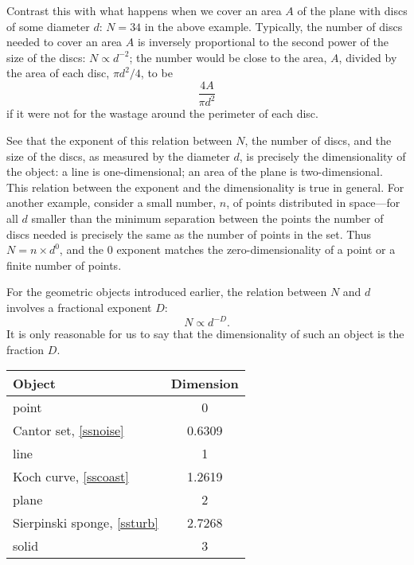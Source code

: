 \documentclass[12pt,a5paper]{article}
\begin{document}
Contrast this with what happens when we cover an area $A$ of the plane 
with discs of some diameter $d$: 
\(
	N=34
\)
 in the above example.  Typically, 
the number of discs needed to cover an area 
\(
	A
\)
is inversely proportional to the second power of the size of the 
discs: $N\propto d^{-2}$; the number would be close to the area, 
$A$, divided by the area of each disc, $\pi d^2/4$, to be  
\[
	\frac{4A}{\pi d^2}
\]
if it were not for the wastage around the perimeter of 
each disc.

See that the exponent of this relation between $N$, the number of 
discs, and the size of the discs, as measured by the diameter $d$, 
is precisely the dimensionality of the object: a line is 
one-dimensional; an area of the plane is two-dimensional.  This 
relation between the exponent and the dimensionality is true in 
general.  For another example, consider a small number, $n$, of 
points distributed in space---for all
\(
	d
\)
smaller than the minimum separation between the points the number of 
discs needed is precisely the same as the number of points in the set.  
Thus $N=n\times d^0$, and the 0 exponent matches the zero-dimensionality 
of a point or a finite number of points.

For the geometric objects introduced earlier, the relation between $
N$ and $d$ involves a fractional exponent $D$:
\begin{equation}
	N\propto d^{-D}.
	\label{eqf}
\end{equation}
It is only reasonable for us to say that the 
dimensionality of such an object is the fraction $D$.
\begin{center}
	\begin{tabular}{lc}
		\hline
		Object & Dimension  \\
		\hline
		point & 0  \\
		Cantor set, \cref{ssnoise} & 0.6309  \\
		line & 1  \\
		Koch curve, \cref{sscoast} & 1.2619  \\
		plane & 2  \\
		Sierpinski sponge, \cref{ssturb} & 2.7268  \\
		solid & 3  \\
		\hline
	\end{tabular}
\end{center}
\end{document}
